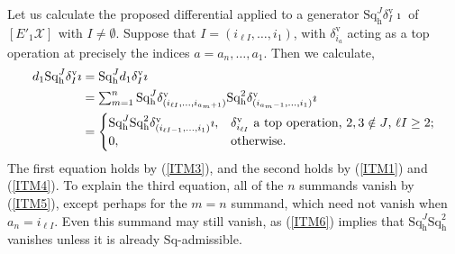 \documentclass[11pt]{amsart} \renewcommand{\baselinestretch}{1.2}
\theoremstyle{plain}
\numberwithin{equation}{section} %
\theoremstyle{plain}
\numberwithin{equation}{chapter} %
\newcommand{\calx}{\mathcal{X}}
\newcommand{\Sq}{\mathrm{Sq}}
\newcommand{\Eprime}[5]{[E'_{#2}#3]^{#4}_{#5}}
\newcommand{\uver}{^\mathrm{v}}
\newcommand{\dhor}{_\mathrm{h}}
\newcommand{\Sqh}{\mathrm{Sq}\dhor}
\newcommand{\deltav}{\delta\uver}
\begin{document}
\begin{Calculations of HWn}
Let us calculate the proposed differential applied to a generator
$\Sqh^J\deltav_I\imath$ of $\Eprime{blank}{1}{\calx}{}{}$ with $I\neq\emptyset$. Suppose that $I=(i_{\ell I},\ldots,i_1)$, with $\deltav_{i_a}$ acting as a top operation at precisely the indices $a={a_n},\ldots,{a_1}$. Then we calculate, 
\begin{alignat*}{2}
d_1\Sqh^J\deltav_I\imath
&=
\Sqh^Jd_1\deltav_I\imath%
\\
&=
\textstyle\sum_{m=1}^{n}\Sqh^J\deltav_{(i_{\ell I},\ldots,i_{a_{m}+1})} \Sqh^{2} \deltav_{(i_{a_{m}-1},\ldots,i_1)}\imath%
\\
&=
\begin{cases}
\smash{\Sqh^J\Sqh^2\deltav_{(i_{{\ell I}-1},\ldots,i_1)}\imath},&\textup{$\deltav_{i_{\ell I}}$ a top operation, $2,3\notin J$, $\ell I\geq2$};\\
0,&\textup{otherwise}.
\end{cases}
\end{alignat*}
The first equation holds by (\ref{ITM3}), and the second holds by (\ref{ITM1}) and (\ref{ITM4}).
To explain the third equation, %
all of the $n$ summands vanish by (\ref{ITM5}), 
except perhaps for the $m=n$ summand, which need not vanish when $a_n=i_{\ell I}$. Even this summand may still vanish, as (\ref{ITM6}) implies that $\Sqh^J\Sqh^2$ vanishes unless it is already $\Sq$-admissible. 


\end{Calculations of HWn}
\end{document}

